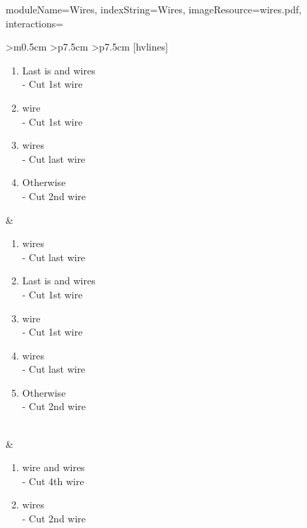 \documentclass{../../ktane-mod}
\begin{document}
\begin{module}{
  moduleName=Wires,
  indexString=Wires,
  imageResource=wires.pdf,
  interactions=\keysymbol
}
\begin{NiceTabular}{
    >{\centering\arraybackslash}m{0.5cm}
    >{\centering\arraybackslash}p{7.5cm}
    >{\centering\arraybackslash}p{7.5cm}
  }[hvlines]
\begin{minipage}[c][5.1cm][t]{\linewidth}
\begin{enumerate}[label=\alph*.,itemsep=0pt]
                                  \item Last is \YELLOW and \RED[no RED] wires\\ - Cut 1st wire
                                  \item \BLUE[1 BLUE] wire\\ - Cut 1st wire
                                  \item \YELLOW[1+ YELLOW] wires\\ - Cut last wire
                                  \item Otherwise\\ - Cut 2nd wire
                                \end{enumerate}
    \end{minipage} & \begin{minipage}[c][5.1cm][t]{\linewidth}
                                                     \vspace*{0.1cm}
                       \begin{enumerate}[label=\alph*.,itemsep=0pt]
                         \item \RED[2+ RED] wires\\ - Cut last \RED wire
                         \item Last is \YELLOW and \RED[no RED] wires\\ - Cut 1st wire
                         \item \BLUE[1 BLUE] wire\\ - Cut 1st wire
                         \item \YELLOW[1+ YELLOW] wires\\ - Cut last wire
                         \item Otherwise\\ - Cut 2nd wire
                       \end{enumerate}
    \end{minipage} \\
     & \begin{minipage}[c][4cm][t]{\linewidth}
                                \vspace*{0.1cm}
                                \begin{enumerate}[label=\alph*.,itemsep=0pt]
                                  \item \RED[1 RED] wire and \YELLOW[2+ YELLOW] wires\\ - Cut 4th wire
                                  \item \BLACK[No BLACK] wires\\ - Cut 2nd wire

\end{enumerate}
\end{minipage}
\end{NiceTabular}
\end{module}
\end{document}

